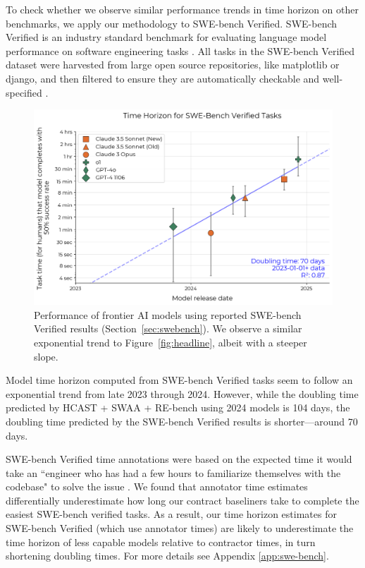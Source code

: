 \documentclass{article}
\newcommand{\gabenchmark}{HCAST}
\begin{document}
To check whether we observe similar performance trends in time horizon on other benchmarks, we apply our methodology to SWE-bench Verified. SWE-bench Verified is an industry standard benchmark for evaluating language model performance on software engineering tasks \cite{o3mini}. All tasks in the SWE-bench Verified dataset were harvested from large open source repositories, like matplotlib or django, and then filtered to ensure they are automatically checkable and well-specified \cite{jimenez2024swebench}.

\begin{figure}
    \centering
    \includegraphics[width=0.8\linewidth]{plots/logistic/swe_bench.png}
    \caption{Performance of frontier AI models using reported SWE-bench Verified results (Section~\ref{sec:swebench}). We observe a similar exponential trend to Figure~\ref{fig:headline}, albeit with a steeper slope.}
    \label{fig:swebench}
\end{figure}

Model time horizon computed from SWE-bench Verified tasks seem to follow an exponential trend from late 2023 through 2024. However, while the doubling time predicted by \gabenchmark{} + SWAA + RE-bench using 2024 models is 104 days, the doubling time predicted by the SWE-bench Verified results is shorter---around 70 days. 

SWE-bench Verified time annotations were based on the expected time it would take an ``engineer who has had a few hours to familiarize themselves with the codebase" to solve the issue \cite{jimenez2024swebench}. We found that annotator time estimates differentially underestimate how long our contract baseliners take to complete the easiest SWE-bench verified tasks. As a result, our time horizon estimates for SWE-bench Verified (which use annotator times) are likely to underestimate the time horizon of less capable models relative to contractor times, in turn shortening doubling times. For more details see Appendix \ref{app:swe-bench}. 
\end{document}
